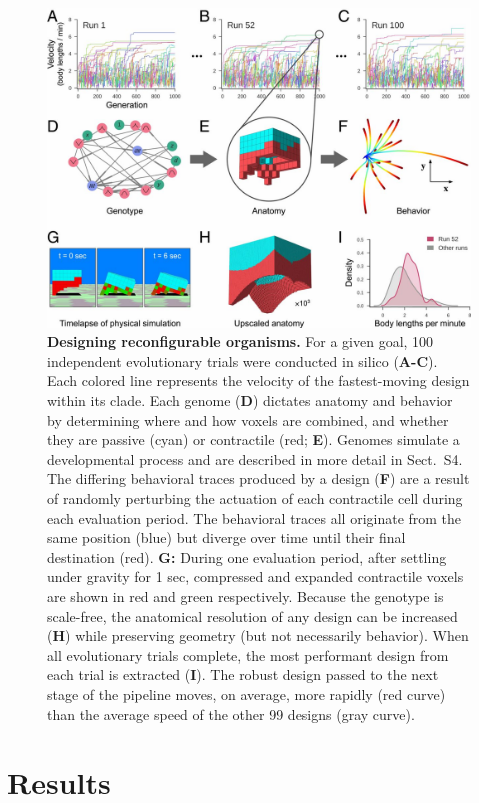 \begin{figure}[!ht]
\centering
\includegraphics[width=0.9\linewidth]{Chapter07/img/F2.large.jpg}
\caption{\textbf{Designing reconfigurable organisms.} For a given goal, 100 independent evolutionary trials were conducted in silico (\textbf{A-C}). Each colored line represents the velocity of the fastest-moving design within its clade. Each genome (\textbf{D}) dictates anatomy and behavior by determining where and how voxels are combined, and whether they are passive (cyan) or contractile (red; \textbf{E}). Genomes simulate a developmental process and are described in more detail in Sect.~S4. The differing behavioral traces produced by a design (\textbf{F}) are a result of randomly perturbing the actuation of each contractile cell during each evaluation period. The behavioral traces all originate from the same position (blue) but diverge over time until their final destination (red). \textbf{G:} During one evaluation period, after settling under gravity for 1 sec, compressed and expanded contractile voxels are shown in red and green respectively. Because the genotype is scale-free, the anatomical resolution of any design can be increased (\textbf{H}) while preserving geometry (but not necessarily behavior). When all evolutionary trials complete, the most performant design from each trial is extracted (\textbf{I}). The robust design passed to the next stage of the pipeline moves, on average, more rapidly (red curve) than the average speed of the other 99 designs (gray curve).}
\end{figure}


\section{Results}

